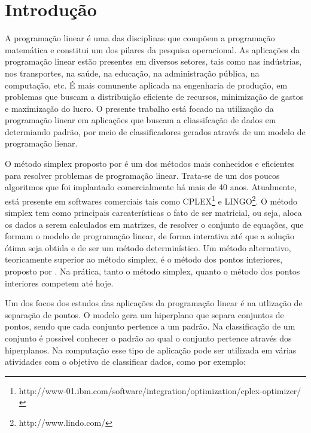\chapter{Introdução}

A programação linear é uma das disciplinas que compõem a programação matemática e constitui um dos pilares da pesquisa operacional. As aplicações da programação linear estão presentes em diversos setores, tais como nas indústrias, nos transportes, na saúde, na educação, na administração pública, na computação, etc. É mais comunente aplicada na engenharia de produção, em problemas que buscam a distribuição eficiente de recursos, minimização de gastos e maximização do lucro. O presente trabalho está focado na utilização da programação linear em aplicações que buscam a cliassifcação de dados em determiando padrão, por meio de classificadores gerados através de um modelo de programação lienar.

O método simplex proposto por  é um dos métodos mais conhecidos e eficientes para resolver problemas de programação linear. Trata-se de um dos poucos algoritmos que foi implantado comercialmente há mais de 40 anos. Atualmente, está presente em softwares comerciais tais como CPLEX\footnote{http://www-01.ibm.com/software/integration/optimization/cplex-optimizer/} e LINGO\footnote{http://www.lindo.com/}. O método simplex tem como principais carcaterísticas o fato de ser matricial, ou seja, aloca os dados a serem calculados em matrizes, de resolver o conjunto de equações, que formam o modelo de programação linear, de forma interativa até que a solução ótima seja obtida e de ser um método determinístico. Um método alternativo, teoricamente superior ao método simplex, é o método dos pontos interiores, proposto por . Na prática, tanto o método simplex, quanto o método dos pontos interiores competem até hoje.  

Um dos focos dos estudos das aplicações da programação linear é na utlização de separação de pontos. O modelo gera um hiperplano que separa conjuntos de pontos, sendo que cada conjunto pertence a um padrão. Na classificação de um conjunto é possivel conhecer o padrão ao qual o conjunto pertence através dos hiperplanos. Na computação esse tipo de aplicação pode ser utilizada em várias atividades com o objetivo de classificar dados, como por exemplo:

